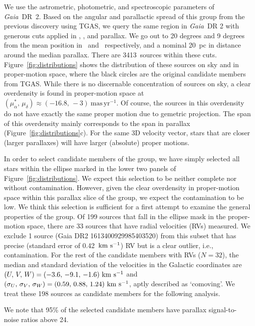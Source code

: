 \documentclass[modern,letterpaper]{aastex61}
\newcommand{\project}[1]{\textsl{#1}}
\newcommand{\acronym}[1]{{\small{#1}}}
\newcommand{\gaia}{\project{Gaia}}
\newcommand{\figname}{Figure}
\newcommand{\tgas}{\acronym{TGAS}}
\newcommand{\kms}{\ensuremath{\rm km~s^{-1}}}
\newcommand{\ra}{\text{R.A.}}
\newcommand{\dec}{\text{Decl.}}
\newcommand{\pmra}{\ensuremath{\mu_\alpha^*}}
\newcommand{\pmdec}{\ensuremath{\mu_\delta}}
\newcommand{\masyr}{\ensuremath{\mathrm{mas}\,\mathrm{yr}^{-1}}}
\newcommand{\nstarsInRegion}{3413}
\begin{document}
We use the astrometric, photometric, and spectroscopic parameters of
\gaia\ DR~2.
Based on the angular and parallactic spread of this group from the previous
discovery using \tgas, we query the same region in \gaia\ DR 2 with generous
cuts applied in \ra, \dec, and parallax.
We go out to 20 degrees and 9 degrees from the mean position in \ra\ and \dec\
respectively, and a nominal 20~pc in distance around the median parallax.
There are \nstarsInRegion\ sources within these cuts.
Figure~\ref{fig:distributions} shows the distribution of these sources on sky
and in proper-motion space, where the black circles are
the original candidate members from \tgas.
While there is no discernable concentration of sources on sky,
a clear overdensity is found in proper-motion space at
$(\pmra,\,\pmdec)\approx(-16.8,\,-3)~\masyr$.
Of course, the sources in this overdensity do not have exactly the same proper motion
due to gemetric projection.
The span of this overdensity mainly corresponds to the span in parallax
(\figname~\ref{fig:distributions}c).
For the same 3D velocity vector, stars that are closer (larger parallaxes) will
have larger (absolute) proper motions.

In order to select candidate members of the group,
we have simply selected all stars within the ellipse marked in the lower two
panels of \figname~\ref{fig:distributions}.
We expect this selection to be neither complete nor without contamination.
However, given the clear overdensity in proper-motion space within this parallax slice
of the group, we expect the contamination to be low.
We think this selection is sufficient for a first attempt to examine the general
properties of the group.
Of 199 sources that fall in the ellipse mask in the proper-motion space,
there are 33 sources that have radial velocities (RVs) measured.
We exclude 1 source (Gaia DR2 1613400929985403520)
from this subset that has precise (standard error of 0.42~\kms) RV but is
a clear outlier, i.e., contamination.
For the rest of the candidate members with RVs ($N=32$),
the median and standard deviation of the velocities in the Galactic coordinates
are $(U,\,V,\,W) = (-3.6,\,-9.1,\,-1.6)~\kms$ and
$(\sigma_U,\,\sigma_V,\,\sigma_W) = (0.59,\,0.88,\,1.24)~\kms$,
aptly described as `comoving'.
We treat these 198 sources as candidate members for the following analysis.


We note that 95\% of the selected candidate members have
parallax signal-to-noise ratios above 24.
\end{document}
